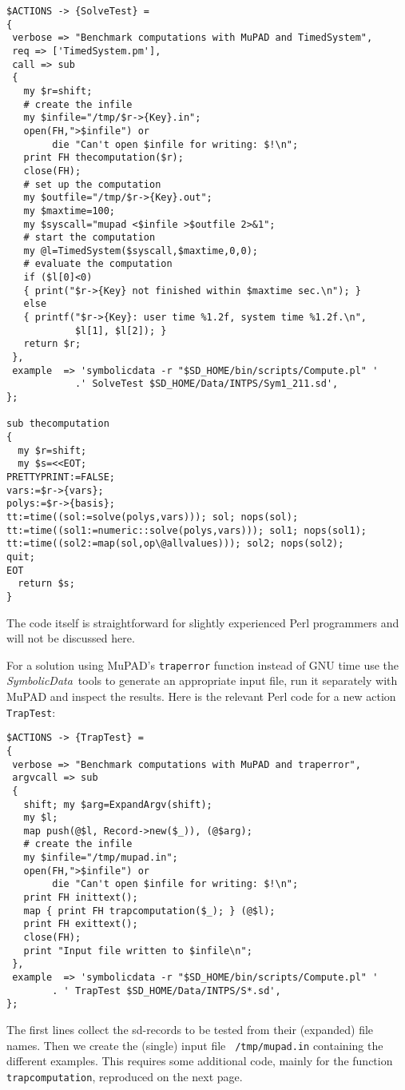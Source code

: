 \documentclass[11pt]{article}
\newcommand{\SD}{{\em Symbo\-lic\-Data}}
\begin{document}
\pagebreak

{\small\begin{verbatim}
$ACTIONS -> {SolveTest} =
{
 verbose => "Benchmark computations with MuPAD and TimedSystem",
 req => ['TimedSystem.pm'],
 call => sub 
 {
   my $r=shift;
   # create the infile
   my $infile="/tmp/$r->{Key}.in";
   open(FH,">$infile") or 
        die "Can't open $infile for writing: $!\n";
   print FH thecomputation($r);
   close(FH);
   # set up the computation
   my $outfile="/tmp/$r->{Key}.out";
   my $maxtime=100;
   my $syscall="mupad <$infile >$outfile 2>&1";
   # start the computation
   my @l=TimedSystem($syscall,$maxtime,0,0);
   # evaluate the computation
   if ($l[0]<0)
   { print("$r->{Key} not finished within $maxtime sec.\n"); }
   else
   { printf("$r->{Key}: user time %1.2f, system time %1.2f.\n", 
            $l[1], $l[2]); }
   return $r;
 },
 example  => 'symbolicdata -r "$SD_HOME/bin/scripts/Compute.pl" '
            .' SolveTest $SD_HOME/Data/INTPS/Sym1_211.sd',
};

sub thecomputation 
{
  my $r=shift;
  my $s=<<EOT;
PRETTYPRINT:=FALSE;
vars:=$r->{vars};
polys:=$r->{basis};
tt:=time((sol:=solve(polys,vars))); sol; nops(sol);
tt:=time((sol1:=numeric::solve(polys,vars))); sol1; nops(sol1);
tt:=time((sol2:=map(sol,op\@allvalues))); sol2; nops(sol2);
quit;
EOT
  return $s;
}
\end{verbatim}}
\pagebreak

The code itself is straightforward for slightly experienced Perl
programmers and will not be discussed here.
\medskip

For a solution using MuPAD's {\tt traperror} function instead of GNU
time use the \SD\ tools to generate an appropriate input file, run it
separately with MuPAD and inspect the results.  Here is the relevant
Perl code for a new action {\tt TrapTest}:
{\small\begin{verbatim}
$ACTIONS -> {TrapTest} =
{
 verbose => "Benchmark computations with MuPAD and traperror",
 argvcall => sub 
 {
   shift; my $arg=ExpandArgv(shift);   
   my $l;
   map push(@$l, Record->new($_)), (@$arg);
   # create the infile
   my $infile="/tmp/mupad.in";
   open(FH,">$infile") or 
        die "Can't open $infile for writing: $!\n";
   print FH inittext();
   map { print FH trapcomputation($_); } (@$l);
   print FH exittext();
   close(FH);
   print "Input file written to $infile\n";
 },
 example  => 'symbolicdata -r "$SD_HOME/bin/scripts/Compute.pl" '
        . ' TrapTest $SD_HOME/Data/INTPS/S*.sd',
};
\end{verbatim}}%
The first lines collect the sd-records to be tested from their
(expanded) file names. Then we create the (single) input file {\tt
/tmp/mupad.in} containing the different examples.  This requires some
additional code, mainly for the function {\tt trapcomputation},
reproduced on the next page.
\end{document}
